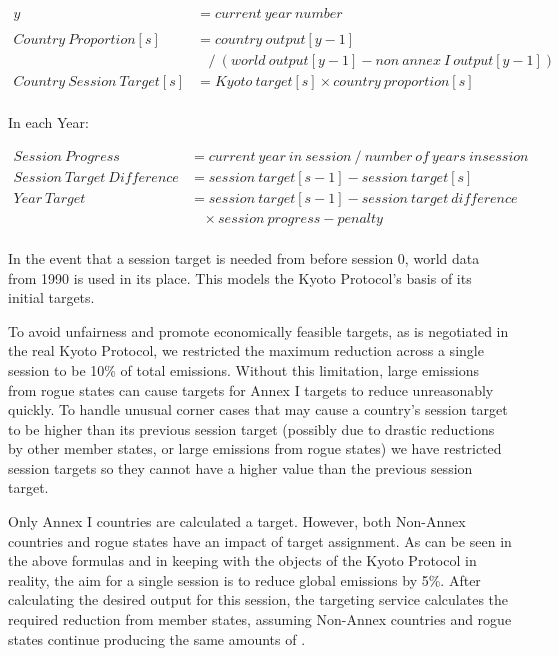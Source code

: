 \begin{align*}
y &= current~year~number\\
\\
Country~Proportion [s] &= country~output [y - 1]\\
&~~~~/~(world~output [y - 1] - non~annex~I~output [y - 1])\\
Country~Session~Target [s] &= Kyoto~target [s] \times country~proportion [s]\\
\end{align*}

In each Year:

\begin{align*}
Session~Progress  &= current~year~in~session~/~number~of~years~in session\\
Session~Target~Difference&= session~target [s - 1] - session~target [s]\\
Year~Target&= session~target[s - 1] - session~target~difference\\
&~~~~\times session~progress - penalty\\
\end{align*}

In the event that a session target is needed from before session 0, world data from 1990 is used in its place. This models the Kyoto Protocol's basis of its initial targets.
 
To avoid unfairness and promote economically feasible targets, as is negotiated in the real Kyoto Protocol, we restricted the maximum reduction across a single session to be 10\% of total emissions. Without this limitation, large emissions from rogue states can cause targets for Annex I targets to reduce unreasonably quickly. To handle unusual corner cases that may cause a country's session target to be higher than its previous session target (possibly due to drastic reductions by other member states, or large emissions from rogue states) we have restricted session targets so they cannot have a higher value than the previous session target.
 
Only Annex I countries are calculated a target. However, both Non-Annex countries and rogue states have an impact of target assignment. As can be seen in the above formulas and in keeping with the objects of the Kyoto Protocol in reality, the aim for a single session is to reduce global \CO emissions by 5\%. After calculating the desired output for this session, the targeting service calculates the required reduction from member states, assuming Non-Annex countries and rogue states continue producing the same amounts of \CO.

